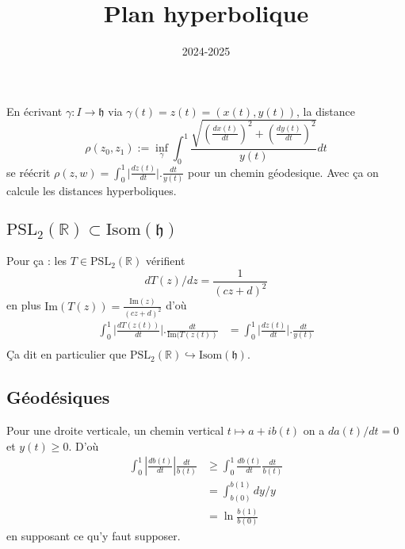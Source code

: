 \documentclass[a4paper,12pt]{article}
\title{Plan hyperbolique}
\date{2024-2025}
\newcommand{\R}{\mathbb{R}}
\renewcommand{\Im}{\textrm{Im}}
\newcommand{\PSL}{\textrm{PSL}}
\newcommand{\h}{\mathfrak{h}}
\theoremstyle{plain}
\theoremstyle{definition}
\theoremstyle{remark}
\begin{document}
\maketitle
\tableofcontents
En écrivant $\gamma\colon I\to \h$ via $\gamma(t)=z(t)=(x(t),y(t))$,
la distance
\[\rho(z_0,z_1):=\inf_\gamma\int_0^1\frac{\sqrt{\left(\frac{dx(t)}{dt}\right)^2+\left(\frac{dy(t)}{dt}\right)^2}}{y(t)}dt\]
se réécrit $\rho(z,w)=\int_0^1\lvert\frac{dz(t)}{dt}\rvert.\frac{dt}{y(t)}$
pour un chemin géodesique. Avec ça on 
calcule les distances hyperboliques.

\subsection{$\PSL_2(\R)\subset \textrm{Isom}(\h)$}
Pour ça : les $T\in \PSL_2(\R)$ vérifient 
\[dT(z)/dz=\frac{1}{(cz+d)^2}\]
en plus $\Im(T(z))=\frac{\Im(z)}{(cz+d)^2}$ d'où
\begin{align*}
  \int_0^1\lvert\frac{dT(z(t))}{dt}\rvert.\frac{dt}{\Im(T(z(t))}&=\int_0^1\lvert\frac{dz(t)}{dt}\rvert.\frac{dt}{y(t)}\\
\end{align*}
Ça dit en particulier que $\PSL_2(\R)\hookrightarrow
\textrm{Isom}(\h)$. 

\subsection{Géodésiques}
Pour une droite verticale, un chemin vertical
$t\mapsto a+ib(t)$ on a $da(t)/dt=0$ et $y(t)\geq 0$.
D'où
\begin{align*}
\int_0^1|\frac{db(t)}{dt}|\frac{dt}{b(t)}&\geq\int_0^1\frac{db(t)}{dt}\frac{dt}{b(t)}\\
					 &=\int_{b(0)}^{b(1)} dy/y\\
					 &=\ln\frac{b(1)}{b(0)}
\end{align*}
en supposant ce qu'y faut supposer.




\end{document}
